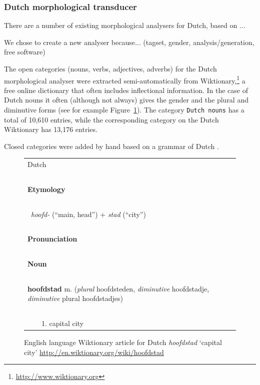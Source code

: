\documentclass[11pt]{article}
\begin{document}
\subsubsection{Dutch morphological transducer}

There are a number of existing morphological analysers for Dutch, based on ...

We chose to create a new analyser because... (tagset, gender, analysis/generation, free software)

The open categories (nouns, verbs, adjectives, adverbs) for the Dutch 
morphological analyser were extracted semi-automatically from 
Wiktionary,\footnote{\url{http://www.wiktionary.org}} a free online 
dictionary that often includes inflectional information. In the case 
of Dutch nouns it often (although not always) gives the gender and the 
plural and diminutive forms (see for example Figure~\ref{fig:wikt1}).
The category {\small {\tt Dutch nouns}} has a total of 10,610 entries,
while the corresponding category on the Dutch Wiktionary has 13,176 entries.

Closed categories were added by hand based on a grammar of Dutch \cite{Shetter:02}.

\begin{figure}
\centering
\begin{small}
\begin{tabular}{|l|}
\hline
{\large Dutch} \\
~\\
{\bf Etymology}\\
~\\
~{\em hoofd-} (``main, head'') + {\em stad} (``city'')\\
~\\
{\bf Pronunciation}\\
~\\
{\bf Noun}\\
~\\
{\bf hoofdstad} m. ({\em plural} hoofdsteden, {\em diminutive} hoofdstadje, {\em diminutive} plural hoofdstadjes) \\
~\\
~~~~1. capital city \\

\hline
\end{tabular}
\end{small}
\caption{English language Wiktionary article for Dutch \emph{hoofdstad} `capital city' 
    {\small \url{http://en.wiktionary.org/wiki/hoofdstad}}}
\label{fig:wikt1}
\end{figure}
\end{document}
